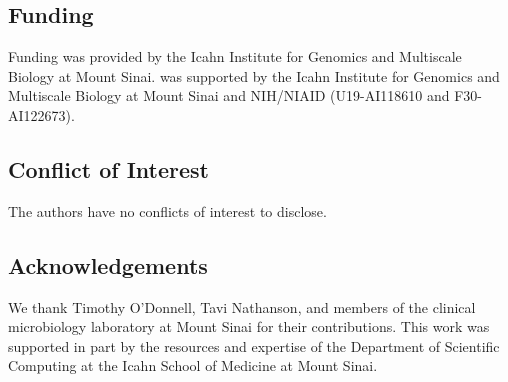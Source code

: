 \subsection*{Funding}

Funding was provided by the Icahn Institute for Genomics and Multiscale Biology at Mount Sinai.  was supported by the Icahn Institute for Genomics and Multiscale Biology at Mount Sinai and NIH/NIAID (U19-AI118610 and F30-AI122673).

\subsection*{Conflict of Interest}

The authors have no conflicts of interest to disclose.

\subsection*{Acknowledgements}

We thank Timothy O’Donnell, Tavi Nathanson, and members of the clinical microbiology laboratory at Mount Sinai for their contributions. This work was supported in part by the resources and expertise of the Department of Scientific Computing at the Icahn School of Medicine at Mount Sinai.
